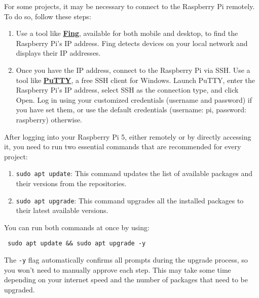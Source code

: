 For some projects, it may be necessary to connect to the Raspberry Pi remotely. To do so, follow these steps:
\begin{enumerate}
\item Use a tool like \href{https://www.fing.com/}{\textbf{\color{blue}Fing}}, available for both mobile and desktop, to find the Raspberry Pi's IP address. Fing detects devices on your local network and displays their IP addresses. 
\item Once you have the IP address, connect to the Raspberry Pi via SSH. Use a tool like \href{https://www.chiark.greenend.org.uk/~sgtatham/putty/}{\textbf{\color{blue}PuTTY}}, a free SSH client for Windows. Launch PuTTY, enter the Raspberry Pi's IP address, select SSH as the connection type, and click Open. Log in using your customized credentials (username and password) if you have set them, or use the default credentials (username: pi, password: raspberry) otherwise.
\end{enumerate}

After logging into your Raspberry Pi 5, either remotely or by directly accessing it, you need to run two essential commands that are recommended for every project:
\begin{enumerate}
\item \texttt{sudo apt update}: This command updates the list of available packages and their versions from the repositories.
\item \texttt{sudo apt upgrade}: This command upgrades all the installed packages to their latest available versions.
\end{enumerate}

You can run both commands at once by using:
\begin{verbatim} sudo apt update && sudo apt upgrade -y \end{verbatim}

The \texttt{-y} flag automatically confirms all prompts during the upgrade process, so you won't need to manually approve each step. This may take some time depending on your internet speed and the number of packages that need to be upgraded.
